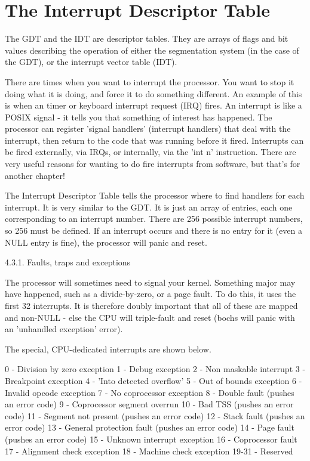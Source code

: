 \documentclass[11pt]{article}
\begin{document}
\section{The Interrupt Descriptor Table}

The GDT and the IDT are descriptor tables. They are arrays of flags and bit values describing the operation of either the segmentation system (in the case of the GDT), or the interrupt vector table (IDT).

There are times when you want to interrupt the processor. You want to stop it doing what it is doing, and force it to do something different. An example of this is when an timer or keyboard interrupt request (IRQ) fires. An interrupt is like a POSIX signal - it tells you that something of interest has happened. The processor can register 'signal handlers' (interrupt handlers) that deal with the interrupt, then return to the code that was running before it fired. Interrupts can be fired externally, via IRQs, or internally, via the 'int n' instruction. There are very useful reasons for wanting to do fire interrupts from software, but that's for another chapter!

The Interrupt Descriptor Table tells the processor where to find handlers for each interrupt. It is very similar to the GDT. It is just an array of entries, each one corresponding to an interrupt number. There are 256 possible interrupt numbers, so 256 must be defined. If an interrupt occurs and there is no entry for it (even a NULL entry is fine), the processor will panic and reset.

4.3.1. Faults, traps and exceptions

The processor will sometimes need to signal your kernel. Something major may have happened, such as a divide-by-zero, or a page fault. To do this, it uses the first 32 interrupts. It is therefore doubly important that all of these are mapped and non-NULL - else the CPU will triple-fault and reset (bochs will panic with an 'unhandled exception' error).

The special, CPU-dedicated interrupts are shown below.

0 - Division by zero exception
1 - Debug exception
2 - Non maskable interrupt
3 - Breakpoint exception
4 - 'Into detected overflow'
5 - Out of bounds exception
6 - Invalid opcode exception
7 - No coprocessor exception
8 - Double fault (pushes an error code)
9 - Coprocessor segment overrun
10 - Bad TSS (pushes an error code)
11 - Segment not present (pushes an error code)
12 - Stack fault (pushes an error code)
13 - General protection fault (pushes an error code)
14 - Page fault (pushes an error code)
15 - Unknown interrupt exception
16 - Coprocessor fault
17 - Alignment check exception
18 - Machine check exception
19-31 - Reserved
\end{document}
